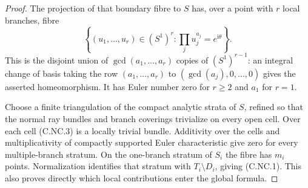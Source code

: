 \begin{proof}
The projection of that boundary fibre to $S$ has, over a point with $r$ local branches, fibre
\[
 \left\{(u_1,\ldots,u_r)\in(S^1)^r:
             \prod_j u_j^{a_j}=e^{\mathrm i\theta}\right\}.
 \tag{C.NC.3}
\]
This is the disjoint union of $\gcd(a_1,\ldots,a_r)$ copies of $(S^1)^{r-1}$: an integral change of basis taking the row $(a_1,\ldots,a_r)$ to $(\gcd(a_j),0,\ldots,0)$ gives the asserted homeomorphism. It has Euler number zero for $r\ge2$ and $a_1$ for $r=1$.

Choose a finite triangulation of the compact analytic strata of $S$, refined so that the normal ray bundles and branch coverings trivialize on every open cell. Over each cell (C.NC.3) is a locally trivial bundle. Additivity over the cells and multiplicativity of compactly supported Euler characteristic give zero for every multiple-branch stratum. On the one-branch stratum of $S_i$ the fibre has $m_i$ points. Normalization identifies that stratum with $T_i\setminus D_i$, giving (C.NC.1). This also proves directly which local contributions enter the global formula.
\end{proof}



